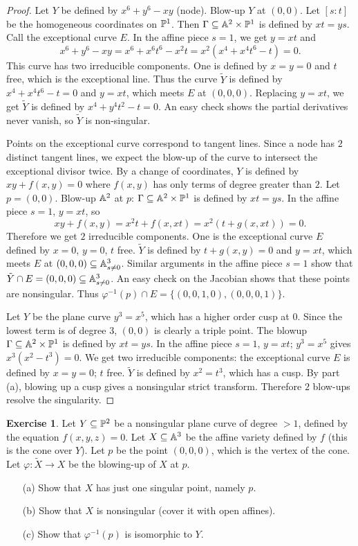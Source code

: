 \documentclass[11pt]{book}
\theoremstyle{definition}
\newtheorem{exercise}{Exercise}[section]
\begin{document}
\begin{proof}
Let $Y$ be defined by $x^6+y^6-xy$ (node). Blow-up $Y$ at $(0,0)$. Let $[s:t]$ be the homogeneous coordinates on $\P^1$. Then $\Gamma\sub\A^2\times\P^1$ is defined by $xt=ys$. Call the exceptional curve $E$. In the affine piece $s=1$, we get $y=xt$ and
\[x^6+y^6-xy=x^6+x^6t^6-x^2t=x^2(x^4+x^4t^6-t)=0.\]
This curve has two irreducible components. One is defined by $x=y=0$ and $t$ free, which is the exceptional line. Thus the curve $\tilde{Y}$ is defined by $x^4+x^4t^6-t=0$ and $y=xt$, which meets $E$ at $(0,0,0)$. Replacing $y=xt$, we get $\tilde{Y}$ is defined by $x^4+y^4t^2-t=0$. An easy check shows the partial derivatives never vanish, so $\tilde{Y}$ is non-singular.\par
Points on the exceptional curve correspond to tangent lines. Since a node has $2$ distinct tangent lines, we expect the blow-up of the curve to intersect the exceptional divisor twice. By a change of coordinates, $Y$ is defined by $xy+f(x,y)=0$ where $f(x,y)$ has only terms of degree greater than $2$. Let $p=(0,0)$. Blow-up $\A^2$ at $p$: $\Gamma\sub\A^2\times\P^1$ is defined by $xt=ys$. In the affine piece $s=1$, $y=xt$, so
\[xy+f(x,y)=x^2t+f(x,xt)=x^2(t+g(x,xt))=0.\]
Therefore we get $2$ irreducible components. One is the exceptional curve $E$ defined by $x=0$, $y=0$, $t$ free. $\tilde{Y}$ is defined by $t+g(x,y)=0$ and $y=xt$, which meets $E$ at $(0,0,0)\sub\A^3_{s\neq 0}$. Similar arguments in the affine piece $s=1$ show that $\tilde{Y}\cap E=(0,0,0)\sub\A^3_{s\neq 0}$. An easy check on the Jacobian shows that these points are nonsingular. Thus $\varphi^{-1}(p)\cap E=\{(0,0,1,0),(0,0,0,1)\}$.\par
Let $Y$ be the plane curve $y^3=x^5$, which has a higher order cusp at $0$. Since the lowest term is of degree $3$, $(0,0)$ is clearly a triple point. The blowup $\Gamma\sub\A^2\times\P^1$ is defined by $xt=ys$. In the affine piece $s=1$, $y=xt$; $y^3=x^5$ gives $x^3(x^2-t^3)=0$. We get two irreducible components: the exceptional curve $E$ is defined by $x=y=0$; $t$ free. $\tilde{Y}$ is defined by $x^2=t^3$, which has a cusp. By part (a), blowing up a cusp gives a nonsingular strict transform. Therefore $2$ blow-ups resolve the singularity.
\end{proof}
\begin{exercise}
Let $Y\sub\P^2$ be a nonsingular plane curve of degree $>1$, defined by the equation $f(x,y,z)=0$. Let $X\sub\A^3$ be the affine variety defined by $f$ (this is the cone over $Y$). Let $p$ be the point $(0,0,0)$, which is the vertex of the cone. Let $\varphi:\tilde{X}\to X$ be the blowing-up of $X$ at $p$.
\begin{itemize}
\item[(a)] Show that $X$ has just one singular point, namely $p$.
\item[(b)] Show that $X$ is nonsingular (cover it with open affines).
\item[(c)] Show that $\varphi^{-1}(p)$ is isomorphic to $Y$.
\end{itemize}
\end{exercise}
\end{document}

